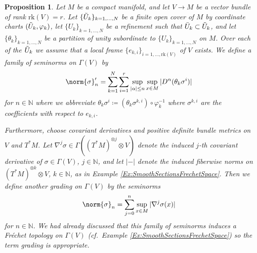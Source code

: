 \documentclass[12pt,a4paper]{article}
\theoremstyle{plain}
\newtheorem{proposition}[theorem]{Proposition}
\theoremstyle{definition}
\newcommand{\N}{\mathbb{N}}
\newcommand{\nnorm}[2]{\norm{#1}_{#2}}
\newcommand{\tens}{\otimes}
\begin{document}
\begin{appendices}
\begin{proposition}
\label{Prop:equiv of norms on Gamma(V)}
Let $M$ be a compact manifold, and let $V\to M$ be a vector bundle of rank $\mathrm{rk}(V)=r$. Let $\{\Tilde{U}_k\}_{k=1,...,N}$ be a finite open cover of $M$ by coordinate charts $(\Tilde{U}_k,\varphi_k)$, let $\{U_k\}_{k=1,...,N}$ be a refinement such that $\Bar{U}_k\subset \Tilde{U}_k$, and let $\{\theta_k\}_{k=1,...,N}$ be a partition of unity subordinate to $\{U_k\}_{k=1,...,N}$ on $M$. Over each of the $\Tilde{U}_k$ we assume that a local frame $\{e_{k,i}\}_{i=1,...,\mathrm{rk}(V)}$ of $V$ exists. We define a family of seminorms on $\Gamma(V)$ by 
\begin{equation*}
    \nnorm{\sigma}{n}'=\sum_{k=1}^N\sum_{i=1}^r\sup_{|\alpha|\leq n}\sup_{x\in M}|D^{\alpha}(\theta_k\sigma^i)|
\end{equation*}
for $n\in \N$ where we abbreviate $\theta_k\sigma^i\coloneqq (\theta_k\sigma^{k,i})\circ\varphi_k^{-1}$ where $\sigma^{k,i}$ are the coefficients with respect to $e_{k,i}$.

Furthermore, choose covariant derivatives and positive definite bundle metrics on $V$ and $T^*M$. Let $\nabla^j\sigma\in \Gamma((T^*M)^{\tens j}\tens V)$ denote the induced $j$-th covariant derivative of $\sigma\in \Gamma(V)$, $j\in \N$, and let $|-|$ denote the induced fiberwise norms on $(T^*M)^{\tens k}\tens V$, $k\in \N$, as in Example \ref{Ex:SmoothSectionsFrechetSpace}. Then we define another grading on $\Gamma(V)$ by the seminorms
\begin{equation*}
    \nnorm{\sigma}{n}=\sum_{j=0}^n\sup_{x\in M}|\nabla^j\sigma(x)|
\end{equation*}
for $n\in \N$. We had already discussed that this family of seminorms induces a Fréchet topology on $\Gamma(V)$ (cf.~Example 
\ref{Ex:SmoothSectionsFrechetSpace}) so the term grading is appropriate.



\end{proposition}
\end{appendices}
\end{document}
